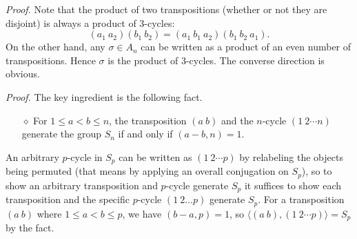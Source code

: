 \documentclass{mathproblems}
\begin{document}
\begin{questions}
\textit{Proof.} Note that the product of two transpositions (whether or not they are disjoint) is always a product of 3-cycles: 
$$
(a_{1} \ a_{2})(b_{1}\ b_{2})=(a_{1}\ b_{1}\ a_{2})(b_{1}\ b_{2}\ a_{1}).
$$
On the other hand, any $\sigma\in A_{n}$ can be written as a product of an even number of transpositions. Hence $\sigma$ is the product of 3-cycles. The converse direction is obvious.


\textit{Proof.} The key ingredient is the following fact. \vspace{-4pt}
\begin{itemize}
\item[$\diamond$] For $1\leqslant a<b\leqslant n$, the transposition $(a \ b)$ and the $n$-cycle $(1\ 2 \cdots n)$ generate the group $S_n$ if and only if $(a-b,n)=1$.
\end{itemize} \vspace{-4pt}
An arbitrary $p$-cycle in $S_p$ can be written as $(1\ 2 \cdots p)$ by relabeling the objects being permuted (that means by applying an overall conjugation on $S_p$), so to show an arbitrary transposition and $p$-cycle generate $S_p$ it suffices to show each transposition and the specific $p$-cycle $(1\ 2 \ldots p)$ generate $S_p$. For a transposition $(a\ b)$ where $1 \leqslant a<b \leqslant p$, we have $(b-a, p)=1$, so $\langle(a\ b),(1\ 2 \cdots p)\rangle=S_p$ by the fact. 


\end{questions}
\end{document}
